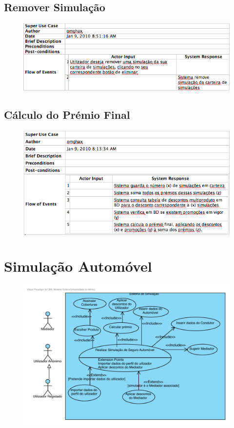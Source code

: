 \subsection{Remover Simulação}
\begin{figure}[!htb]
	\centering
	\includegraphics[scale=0.63]{images/Prints/Simulador/RemoverSimulacao.png}
\end{figure}

\subsection{Cálculo do Prémio Final}
\begin{figure}[!htb]
	\centering
	\includegraphics[scale=0.63]{images/Prints/Simulador/CalcularPremioFinal.png}
\end{figure}


\pagebreak

\section{Simulação Automóvel}
\begin{figure}[!htb]
	\centering
	\includegraphics[scale=0.85]{images/Prints/RealizacaoSeguroAutomovel/SimulacaoSeguroAuto.pdf}
\end{figure}

